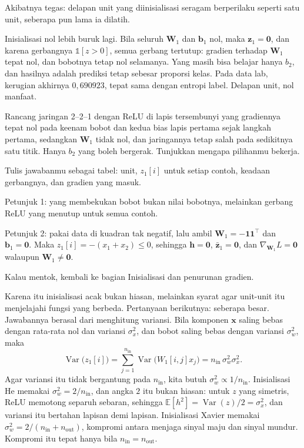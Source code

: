 Akibatnya tegas: delapan unit yang diinisialisasi seragam berperilaku seperti satu unit, seberapa pun lama ia dilatih. 

Inisialisasi nol lebih buruk lagi. Bila seluruh $\mathbf{W}_{1}$ dan $\mathbf{b}_{1}$ nol,
maka $\mathbf{z}_{1}=\mathbf{0}$, dan karena gerbangnya $\mathbb{1}[z>0]$, semua gerbang
tertutup: gradien terhadap $\mathbf{W}_{1}$ tepat nol, dan bobotnya tetap nol selamanya.
Yang masih bisa belajar hanya $b_{2}$, dan hasilnya adalah prediksi tetap sebesar proporsi
kelas. Pada data lab, kerugian akhirnya $0{,}690923$, tepat sama dengan entropi label. Delapan unit, nol manfaat.

\begin{tantangan}
Rancang jaringan 2--2--1 dengan ReLU di lapis tersembunyi yang gradiennya tepat nol pada
keenam bobot dan kedua bias lapis pertama sejak langkah pertama, sedangkan
$\mathbf{W}_{1}$ tidak nol, dan jaringannya tetap salah pada sedikitnya satu titik.
Hanya $b_{2}$ yang boleh bergerak. Tunjukkan mengapa pilihanmu bekerja.

Tulis jawabanmu sebagai tabel: unit, $z_{1}[i]$ untuk setiap contoh, keadaan gerbangnya, dan gradien yang masuk.

Petunjuk 1: yang membekukan bobot bukan nilai bobotnya, melainkan gerbang ReLU yang menutup untuk semua contoh.

Petunjuk 2: pakai data di kuadran tak negatif, lalu ambil
$\mathbf{W}_{1}=-\mathbf{1}\mathbf{1}^{\top}$ dan $\mathbf{b}_{1}=\mathbf{0}$. Maka
$z_{1}[i]=-(x_{1}+x_{2})\le0$, sehingga $\mathbf{h}=\mathbf{0}$,
$\bar{\mathbf{z}}_{1}=\mathbf{0}$, dan $\nabla_{\mathbf{W}_{1}}L=\mathbf{0}$ walaupun
$\mathbf{W}_{1}\neq\mathbf{0}$.

Kalau mentok, kembali ke bagian Inisialisasi dan penurunan gradien.
\end{tantangan}


Karena itu inisialisasi acak bukan hiasan, melainkan syarat agar unit-unit itu menjelajahi
fungsi yang berbeda. Pertanyaan berikutnya: seberapa besar. Jawabannya berasal dari
menghitung variansi. Bila komponen $\mathbf{x}$ saling bebas dengan rata-rata nol dan
variansi $\sigma_{x}^{2}$, dan bobot saling bebas dengan variansi $\sigma_{w}^{2}$, maka
\[
  \operatorname{Var}\bigl(z_{1}[i]\bigr)
  =\sum_{j=1}^{n_{\mathrm{in}}}\operatorname{Var}\bigl(W_{1}[i,j]x_{j}\bigr)
  =n_{\mathrm{in}}\,\sigma_{w}^{2}\sigma_{x}^{2}.
\]
Agar variansi itu tidak bergantung pada $n_{\mathrm{in}}$, kita butuh
$\sigma_{w}^{2}\propto1/n_{\mathrm{in}}$. Inisialisasi He memakai $\sigma_{w}^{2}=2/n_{\mathrm{in}}$,
dan angka $2$ itu bukan hiasan: untuk $z$ yang simetris, ReLU memotong separuh sebaran,
sehingga $\mathbb{E}[h^{2}]=\operatorname{Var}(z)/2=\sigma_{x}^{2}$, dan variansi itu
bertahan lapisan demi lapisan. Inisialisasi Xavier memakai
$\sigma_{w}^{2}=2/(n_{\mathrm{in}}+n_{\mathrm{out}})$, kompromi antara menjaga sinyal maju
dan sinyal mundur. Kompromi itu tepat hanya bila $n_{\mathrm{in}}=n_{\mathrm{out}}$.


